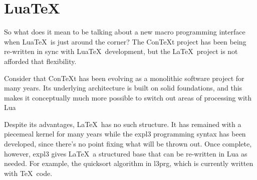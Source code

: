 \documentclass{ltugboat}
\def\pkg#1{\textsf{#1}}
\begin{document}
\section{Lua\TeX}

So what does it mean to be talking about a new macro programming interface
when Lua\TeX\ is just around the corner? The Con\TeX{}t project has been being
re-written in sync with Lua\TeX\ development, but the \LaTeX\ project is not
afforded that flexibility.

Consider that Con\TeX{}t has been evolving as a monolithic software project
for many years. Its underlying architecture is built on solid foundations, and
this makes it conceptually much more possible to switch out areas of
processing with Lua

Despite its advantages, \LaTeX\ has no such structure. It has remained with a
piecemeal kernel for many years while the \pkg{expl3} programming syntax has
been developed, since there's no point fixing what will be thrown out. Once
complete, however, \pkg{expl3} gives \LaTeX\ a structured base that can be
re-written in Lua as needed. For example, the quicksort algorithm in
\pkg{l3prg}, which is currently written with \TeX\ code.
\end{document}
